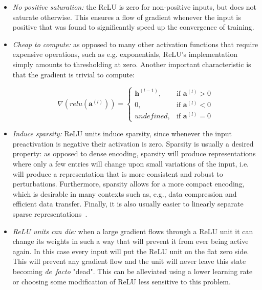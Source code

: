 \begin{itemize}
    \item \emph{No positive saturation:} the ReLU is zero for non-positive
        inputs, but does not saturate otherwise. This ensures a flow of
        gradient whenever the input is positive that was found to significantly
        speed up the convergence of training.
    \item \emph{Cheap to compute:} as opposed to many other activation
        functions that require expensive operations, such as e.g. exponentials,
        ReLU's implementation simply amounts to thresholding at zero. Another
        important characteristic is that the gradient is trivial to compute:

        \begin{equation}\label{eq:relu_derivative}
            \nabla (relu(\mathbf{a}^{(l)})) =
                \begin{cases}
                    \mathbf{h}^{(l-1)},  & \text{if } \mathbf{a}^{(l)} > 0 \\
                    0,          & \text{if } \mathbf{a}^{(l)} < 0 \\
                    undefined,  & \text{if } \mathbf{a}^{(l)} = 0
                \end{cases}
        \end{equation}

    \item \emph{Induce sparsity:} ReLU units induce sparsity, since whenever
        the input preactivation is negative their activation is zero. Sparsity
        is usually a desired property: as opposed to dense encoding, sparsity
        will produce representations where only a few entries will change
        upon small variations of the input, i.e. will produce a representation
        that is more consistent and robust to perturbations. Furthermore,
        sparsity allows for a more compact encoding, which is desirable in many
        contexts such as, e.g., data compression and efficient data transfer.
        Finally, it is also usually easier to linearly separate sparse
        representations~\citep{Glorot+al-AI-2011-small}.
    \item \emph{ReLU units can die:} when a large gradient flows through a ReLU
        unit it can change its weights in such a way that will prevent it from
        ever being active again. In this case every input will put the ReLU
        unit on the flat zero side. This will prevent any gradient flow and the
        unit will never leave this state becoming \emph{de~facto} "dead". This
        can be alleviated using a lower learning rate or choosing some
        modification of ReLU less sensitive to this problem.
\end{itemize}

